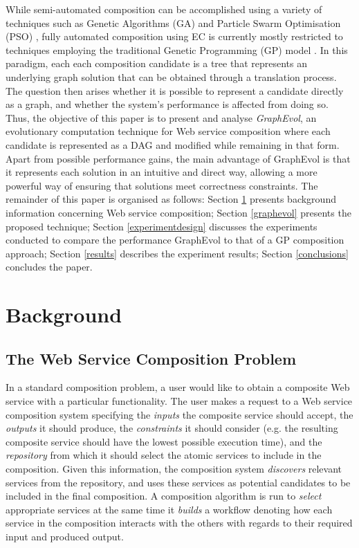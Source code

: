\documentclass{article}
\begin{document}
While semi-automated composition can be accomplished using a variety of techniques such as Genetic Algorithms (GA) and Particle Swarm Optimisation
(PSO) \cite{silva2014graph}, fully automated composition using EC is currently mostly restricted to techniques employing the traditional Genetic Programming (GP) model \cite{rodriguez2010composition}.
In this paradigm, each each composition candidate is a tree that represents an underlying graph solution that can be obtained through a translation
process. The question then arises whether it is possible to represent a candidate directly as a graph, and whether the system's performance is affected
from doing so. Thus, the objective of this paper is to present and analyse \textit{GraphEvol}, an evolutionary computation technique for Web service
composition where each candidate is represented as a DAG and modified while remaining in that form. Apart from possible performance gains, the main
advantage of GraphEvol is that it represents each solution in an intuitive and direct way, allowing a more powerful way of ensuring that solutions
meet correctness constraints. The remainder of this paper is organised as follows:
Section \ref{background} presents background information concerning Web service composition; Section \ref{graphevol} presents the proposed technique;
Section \ref{experimentdesign} discusses the experiments conducted to compare the performance GraphEvol to that of a GP composition approach;
Section \ref{results} describes the experiment results; Section \ref{conclusions} concludes the paper.

\section{Background}\label{background}

\subsection{The Web Service Composition Problem}
In a standard composition problem, a user would like to obtain a composite Web service with a particular functionality. The user makes a request to a Web
service composition system specifying the \textit{inputs} the composite service should accept, the \textit{outputs} it should produce, the \textit{constraints}
it should consider (e.g. the resulting composite service should have the lowest possible execution time), and the \textit{repository} from which it should select
the atomic services to include in the composition. Given this information, the composition system \textit{discovers} relevant services from the repository, and uses
these services as potential candidates to be included in the final composition. A composition algorithm is run to \textit{select} appropriate services at the same
time it \textit{builds} a workflow denoting how each service in the composition interacts with the others with regards to their required input and produced output.
\end{document}
